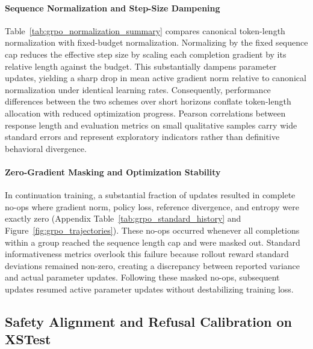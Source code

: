 \documentclass{article}
\begin{document}
\paragraph{Sequence Normalization and Step-Size Dampening}
Table~\ref{tab:grpo_normalization_summary} compares canonical token-length normalization with fixed-budget normalization. Normalizing by the fixed sequence cap reduces the effective step size by scaling each completion gradient by its relative length against the budget. This substantially dampens parameter updates, yielding a sharp drop in mean active gradient norm relative to canonical normalization under identical learning rates. Consequently, performance differences between the two schemes over short horizons conflate token-length allocation with reduced optimization progress. Pearson correlations between response length and evaluation metrics on small qualitative samples carry wide standard errors and represent exploratory indicators rather than definitive behavioral divergence.

\paragraph{Zero-Gradient Masking and Optimization Stability}
In continuation training, a substantial fraction of updates resulted in complete no-ops where gradient norm, policy loss, reference divergence, and entropy were exactly zero (Appendix Table~\ref{tab:grpo_standard_history} and Figure~\ref{fig:grpo_trajectories}). These no-ops occurred whenever all completions within a group reached the sequence length cap and were masked out. Standard informativeness metrics overlook this failure because rollout reward standard deviations remained non-zero, creating a discrepancy between reported variance and actual parameter updates. Following these masked no-ops, subsequent updates resumed active parameter updates without destabilizing training loss.

\subsection{Safety Alignment and Refusal Calibration on XSTest}
\label{sec:results_safety}
\end{document}
